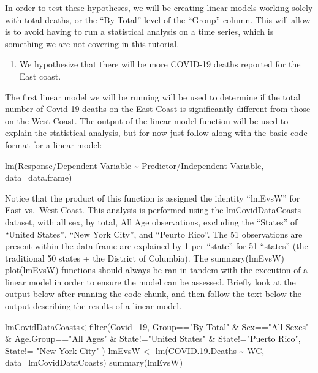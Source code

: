 \documentclass[
]{article}
\newenvironment{Shaded}{\begin{snugshade}}{\end{snugshade}}
\newcommand{\AttributeTok}[1]{\textcolor[rgb]{0.77,0.63,0.00}{#1}}
\newcommand{\FloatTok}[1]{\textcolor[rgb]{0.00,0.00,0.81}{#1}}
\newcommand{\FunctionTok}[1]{\textcolor[rgb]{0.00,0.00,0.00}{#1}}
\newcommand{\NormalTok}[1]{#1}
\newcommand{\OtherTok}[1]{\textcolor[rgb]{0.56,0.35,0.01}{#1}}
\newcommand{\SpecialCharTok}[1]{\textcolor[rgb]{0.00,0.00,0.00}{#1}}
\newcommand{\StringTok}[1]{\textcolor[rgb]{0.31,0.60,0.02}{#1}}
\providecommand{\tightlist}{%
  \setlength{\itemsep}{0pt}\setlength{\parskip}{0pt}}
\begin{document}
In order to test these hypotheses, we will be creating linear models
working solely with total deaths, or the ``By Total'' level of the
``Group'' column. This will allow is to avoid having to run a
statistical analysis on a time series, which is something we are not
covering in this tutorial.

\begin{enumerate}
\def\labelenumi{\arabic{enumi}.}
\tightlist
\item
  We hypothesize that there will be more COVID-19 deaths reported for
  the East coast.
\end{enumerate}

The first linear model we will be running will be used to determine if
the total number of Covid-19 deaths on the East Coast is significantly
different from those on the West Coast. The output of the linear model
function will be used to explain the statistical analysis, but for now
just follow along with the basic code format for a linear model:

lm(Response/Dependent Variable \textasciitilde{} Predictor/Independent
Variable, data=data.frame)

Notice that the product of this function is assigned the identity
``lmEvsW'' for East vs.~West Coast. This analysis is performed using the
lmCovidDataCoasts dataset, with all sex, by total, All Age observations,
excluding the ``States'' of ``United States'', ``New York City'', and
``Peurto Rico''. The 51 observations are present within the data frame
are explained by 1 per ``state'' for 51 ``states'' (the traditional 50
states + the District of Columbia). The summary(lmEvsW) plot(lmEvsW)
functions should always be ran in tandem with the execution of a linear
model in order to ensure the model can be assessed. Briefly look at the
output below after running the code chunk, and then follow the text
below the output describing the results of a linear model.

\begin{Shaded}
\begin{Highlighting}[]
\NormalTok{lmCovidDataCoasts}\OtherTok{\textless{}{-}}\FunctionTok{filter}\NormalTok{(Covid\_19, Group}\SpecialCharTok{==}\StringTok{"By Total"} \SpecialCharTok{\&}\NormalTok{ Sex}\SpecialCharTok{==}\StringTok{"All Sexes"} \SpecialCharTok{\&}\NormalTok{ Age.Group}\SpecialCharTok{==}\StringTok{"All Ages"} \SpecialCharTok{\&}\NormalTok{ State}\SpecialCharTok{!=}\StringTok{"United States"} \SpecialCharTok{\&}\NormalTok{ State}\SpecialCharTok{!=}\StringTok{"Puerto Rico"}\NormalTok{, State}\SpecialCharTok{!=} \StringTok{"New York City"}\NormalTok{ )}
\NormalTok{lmEvsW }\OtherTok{\textless{}{-}} \FunctionTok{lm}\NormalTok{(COVID.}\FloatTok{19.}\NormalTok{Deaths }\SpecialCharTok{\textasciitilde{}}\NormalTok{ WC, }\AttributeTok{data=}\NormalTok{lmCovidDataCoasts)}
\FunctionTok{summary}\NormalTok{(lmEvsW)}
\end{Highlighting}
\end{Shaded}
\end{document}
